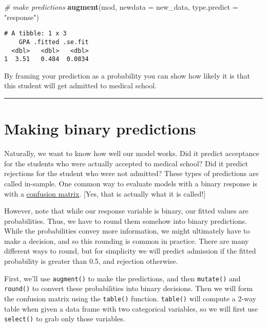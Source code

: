\documentclass[]{book}
\newenvironment{Shaded}{\begin{snugshade}}{\end{snugshade}}
\newcommand{\KeywordTok}[1]{\textcolor[rgb]{0.13,0.29,0.53}{\textbf{#1}}}
\newcommand{\DataTypeTok}[1]{\textcolor[rgb]{0.13,0.29,0.53}{#1}}
\newcommand{\StringTok}[1]{\textcolor[rgb]{0.31,0.60,0.02}{#1}}
\newcommand{\CommentTok}[1]{\textcolor[rgb]{0.56,0.35,0.01}{\textit{#1}}}
\newcommand{\NormalTok}[1]{#1}
\begin{document}
\begin{Shaded}
\begin{Highlighting}[]
\CommentTok{# make predictions}
\KeywordTok{augment}\NormalTok{(mod, }\DataTypeTok{newdata =}\NormalTok{ new_data, }\DataTypeTok{type.predict =} \StringTok{"response"}\NormalTok{)}
\end{Highlighting}
\end{Shaded}

\begin{verbatim}
# A tibble: 1 x 3
    GPA .fitted .se.fit
  <dbl>   <dbl>   <dbl>
1  3.51   0.484  0.0834
\end{verbatim}

By framing your prediction as a probability you can show how likely it
is that this student will get admitted to medical school.

\begin{center}\rule{0.5\linewidth}{\linethickness}\end{center}

\section{Making binary predictions}\label{making-binary-predictions}

Naturally, we want to know how well our model works. Did it predict
acceptance for the students who were actually accepted to medical
school? Did it predict rejections for the student who were not admitted?
These types of predictions are called in-sample. One common way to
evaluate models with a binary response is with a
\href{https://en.wikipedia.org/wiki/Confusion_matrix}{confusion matrix}.
{[}Yes, that is actually what it is called!{]}

However, note that while our response variable is binary, our fitted
values are probabilities. Thus, we have to round them somehow into
binary predictions. While the probabilities convey more information, we
might ultimately have to make a decision, and so this rounding is common
in practice. There are many different ways to round, but for simplicity
we will predict admission if the fitted probability is greater than 0.5,
and rejection otherwise.

First, we'll use \texttt{augment()} to make the predictions, and then
\texttt{mutate()} and \texttt{round()} to convert these probabilities
into binary decisions. Then we will form the confusion matrix using the
\texttt{table()} function. \texttt{table()} will compute a 2-way table
when given a data frame with two categorical variables, so we will first
use \texttt{select()} to grab only those variables.
\end{document}

